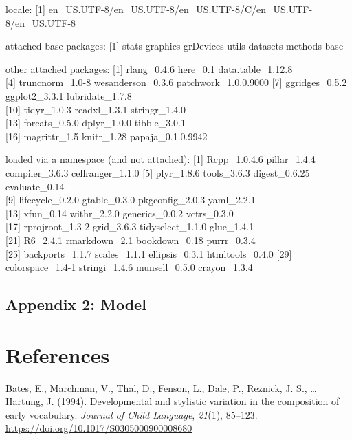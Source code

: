\documentclass[english,man,man,floatsintext]{apa6}
\begin{document}
locale:
{[}1{]} en\_US.UTF-8/en\_US.UTF-8/en\_US.UTF-8/C/en\_US.UTF-8/en\_US.UTF-8

attached base packages:
{[}1{]} stats graphics grDevices utils datasets methods base

other attached packages:
{[}1{]} rlang\_0.4.6 here\_0.1 data.table\_1.12.8\\
{[}4{]} truncnorm\_1.0-8 wesanderson\_0.3.6 patchwork\_1.0.0.9000
{[}7{]} ggridges\_0.5.2 ggplot2\_3.3.1 lubridate\_1.7.8\\
{[}10{]} tidyr\_1.0.3 readxl\_1.3.1 stringr\_1.4.0\\
{[}13{]} forcats\_0.5.0 dplyr\_1.0.0 tibble\_3.0.1\\
{[}16{]} magrittr\_1.5 knitr\_1.28 papaja\_0.1.0.9942

loaded via a namespace (and not attached):
{[}1{]} Rcpp\_1.0.4.6 pillar\_1.4.4 compiler\_3.6.3 cellranger\_1.1.0
{[}5{]} plyr\_1.8.6 tools\_3.6.3 digest\_0.6.25 evaluate\_0.14\\
{[}9{]} lifecycle\_0.2.0 gtable\_0.3.0 pkgconfig\_2.0.3 yaml\_2.2.1\\
{[}13{]} xfun\_0.14 withr\_2.2.0 generics\_0.0.2 vctrs\_0.3.0\\
{[}17{]} rprojroot\_1.3-2 grid\_3.6.3 tidyselect\_1.1.0 glue\_1.4.1\\
{[}21{]} R6\_2.4.1 rmarkdown\_2.1 bookdown\_0.18 purrr\_0.3.4\\
{[}25{]} backports\_1.1.7 scales\_1.1.1 ellipsis\_0.3.1 htmltools\_0.4.0
{[}29{]} colorspace\_1.4-1 stringi\_1.4.6 munsell\_0.5.0 crayon\_1.3.4

\hypertarget{appendix-2-model}{%
\subsection{Appendix 2: Model}\label{appendix-2-model}}

\hypertarget{references}{%
\section{References}\label{references}}

\begingroup
\setlength{\parindent}{-0.5in}
\setlength{\leftskip}{0.5in}

\hypertarget{refs}{}
\leavevmode\hypertarget{ref-bates1994}{}%
Bates, E., Marchman, V., Thal, D., Fenson, L., Dale, P., Reznick, J. S., \ldots{} Hartung, J. (1994). Developmental and stylistic variation in the composition of early vocabulary. \emph{Journal of Child Language}, \emph{21}(1), 85--123. \url{https://doi.org/10.1017/S0305000900008680}
\end{document}
